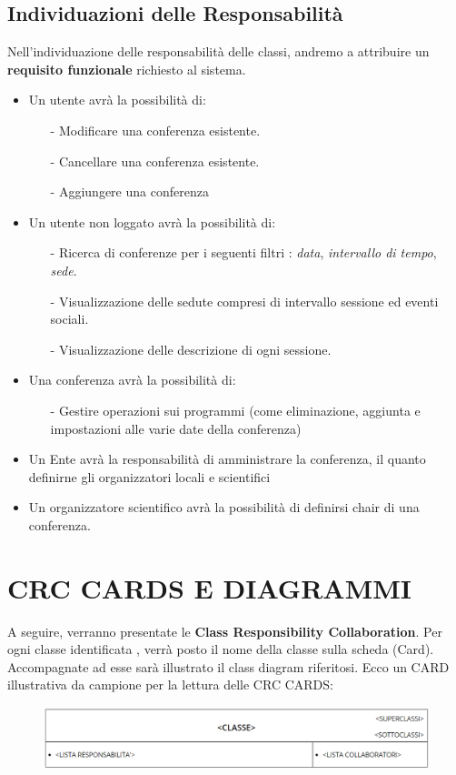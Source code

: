 \documentclass[a4paper,italian,10pt,openany]{book}
\begin{document}
	\section{Individuazioni delle Responsabilità}
	Nell'individuazione delle responsabilità delle classi, andremo a attribuire un \textbf{requisito funzionale} richiesto al sistema.
\begin{itemize}
\item Un utente avrà la possibilità di:
	\begin{itemize}
	\item[-] Modificare una conferenza esistente.
	\item[-] Cancellare una conferenza esistente.
	\item[-] Aggiungere una conferenza
	\end{itemize}
\item Un utente non loggato avrà la possibilità di:
	\begin{itemize}
	\item[-] Ricerca di conferenze per i seguenti filtri : \textit{data},  \textit{intervallo di tempo}, \textit{sede}.
	\item[-] Visualizzazione delle sedute compresi di intervallo sessione ed eventi sociali.
	\item[-] Visualizzazione delle descrizione di ogni sessione.
	\end{itemize}
	\item Una conferenza avrà la possibilità di:
	\begin{itemize}
	\item[-]Gestire operazioni sui programmi (come eliminazione, aggiunta e impostazioni alle varie date della conferenza)
	\end{itemize}
	\item Un Ente avrà la responsabilità di amministrare la conferenza, il quanto definirne gli organizzatori locali e scientifici
	\item Un organizzatore scientifico avrà la possibilità di definirsi chair di una conferenza.
\end{itemize}
\let\cleardoublepage\clearpage
	\chapter{CRC CARDS E DIAGRAMMI}
	A seguire, verranno presentate le \textbf{Class Responsibility Collaboration}. Per ogni classe identificata , verrà posto il nome della classe sulla scheda (Card). Accompagnate ad esse sarà illustrato il class diagram riferitosi. Ecco un CARD illustrativa da campione per la lettura delle CRC CARDS:
	\begin{figure}[h!]
	\centering
	\includegraphics[width=16cm]{crc_cardsEx}
	\end{figure}
	\newpage
\end{document}
